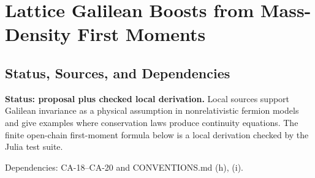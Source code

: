 
\section{Lattice Galilean Boosts from Mass-Density First Moments}
\label{sec:lattice-galilean-boosts}

\subsection{Status, Sources, and Dependencies}

\textbf{Status: proposal plus checked local derivation.}  Local sources support
Galilean invariance as a physical assumption in nonrelativistic fermion models
and give examples where conservation laws produce continuity equations.  The
finite open-chain first-moment formula below is a local derivation checked by
the Julia test suite.

Dependencies: CA-18--CA-20 and CONVENTIONS.md (h), (i).


